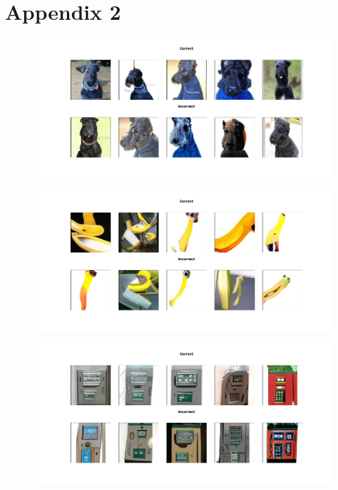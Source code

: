 \documentclass[12pt,a4paper,openany]{book}
\begin{document}
\chapter{Appendix 2}
\begin{figure}[h!]
    \centering
    \includegraphics[scale=0.4]{figs/imagenet_examples/Kerry blue terrier.png}
\end{figure}
\begin{figure}[h!]
    \centering
    \includegraphics[scale=0.4]{figs/imagenet_examples/banana.png}
\end{figure}
\begin{figure}[h!]
    \centering
    \includegraphics[scale=0.4]{figs/imagenet_examples/cash machine.png}
\end{figure}
\end{document}
